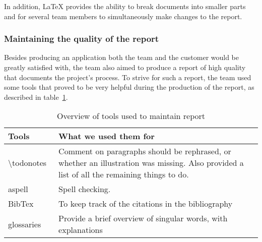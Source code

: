 In addition, LaTeX provides the ability to break documents into smaller parts and for several team members to simultaneously make changes to the report.

\subsubsection{Maintaining the quality of the report}
Besides producing an application both the team and the customer would be greatly satisfied with, the team also aimed to produce a report of high quality that documents the project's process. To strive for such a report, the team used some tools that proved to be very helpful during the production of the report, as described in table~\ref{tab:reportTools}.

\begin{table}[H]
\begin{tabular}{|l|p{13cm}|}
\hline
\textbf{Tools} & \textbf{What we used them for}\\\hline
\textbackslash todonotes~\cite{todo}&Comment on paragraphs should be rephrased, or whether an illustration was missing. Also provided a list of all the remaining things to do.\\\hline
aspell~\cite{aspell} & Spell checking.\\\hline
BibTex~\cite{bibtex}&To keep track of the citations in the bibliography\\\hline
glossaries~\cite{glossaries}& Provide a brief overview of singular words, with explanations\\\hline
\end{tabular}
\caption{Overview of tools used to maintain report}
\label{tab:reportTools}
\end{table}

\begin{comment}
\noindent\textbf{\textbackslash todonotes}\\
Feedback is key when creating a product. The \textbackslash todonotes~\cite{todo} package allowed the team to comment on paragraphs and formulations we wanted to rephrase, whether an illustration was missing, and also gave us a list of all the things we had to do, making it easy to get an overview of the remaining tasks regarding the report.\\

\noindent\textbf{Spell checking: aspell}\\
Although manual proofreading cannot be avoided, it is advantageous to have a tool to perform automatic spell checking. Aspell~\cite{aspell} is such a tool.\\

\noindent\textbf{References and glossary}\\
To keep track of the citations in the bibliography in the report, we used a LaTeX-package called BibTex~\cite{bibtex}, and for our glossaries, a package called glossaries~\cite{glossaries}.

\end{comment}
